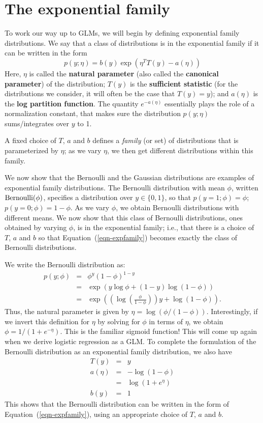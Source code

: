 \documentclass{article}
\begin{document}
\section{The exponential family}

To work our way up to GLMs, we will begin by defining exponential family distributions.
We say that a class of distributions is in the exponential family if it can be written
in the form
\begin{equation}
p(y;\eta) = b(y) \exp(\eta^T T(y) - a(\eta))        \label{eqn-expfamily}
\end{equation}
Here, $\eta$ is called the {\bf natural parameter}
(also called the {\bf canonical parameter}) of the distribution;
$T(y)$ is the {\bf sufficient statistic} (for the distributions we consider,
it will often be the case that $T(y)=y$); and $a(\eta)$ is the {\bf log partition
function}.  The quantity $e^{-a(\eta)}$ essentially plays the role of a normalization
constant, that makes sure the distribution $p(y;\eta)$ sums/integrates over $y$ to 1.

A fixed choice of $T$, $a$ and $b$ defines a \emph{family} (or set) of distributions
that is parameterized by $\eta$; as we vary $\eta$, we then get different distributions
within this family.

We now show that the Bernoulli and the Gaussian distributions are examples of exponential family distributions.
The Bernoulli distribution with mean $\phi$,
written ${\rm Bernoulli}(\phi)$, specifies a distribution over $y \in \{0,1\}$, so that
$p(y=1;\phi)=\phi$; $p(y=0;\phi)=1-\phi$.  As we vary $\phi$, we obtain Bernoulli
distributions with different means.  We now show that this class of Bernoulli
distributions, ones obtained by varying $\phi$, is in the exponential family; i.e.,
that there is a choice of $T$, $a$ and $b$ so that Equation~(\ref{eqn-expfamily})
becomes exactly the class of Bernoulli distributions.

We write the Bernoulli distribution as:
\begin{eqnarray*}
p(y;\phi) &=& \phi^y (1-\phi)^{1-y} \\
&=& \exp(y\log\phi + (1-y) \log(1-\phi)) \\
&=& \exp\left( \left(\log\left(\frac{\phi}{1-\phi}\right)\right)y + \log(1-\phi)\right).
\end{eqnarray*}
Thus, the natural parameter is given by $\eta = \log(\phi/(1-\phi))$.
Interestingly, if we invert this definition for $\eta$ by solving
for $\phi$ in terms of $\eta$, we obtain $\phi = 1/(1+e^{-\eta})$.  This is
the familiar sigmoid function!  This will come up again when we derive logistic
regression as a GLM.  To complete the formulation of the Bernoulli
distribution as an exponential family
distribution, we also have
\begin{eqnarray*}
T(y) &=& y \\
a(\eta) &=& -\log(1-\phi) \\
  &=& \log(1+e^\eta) \\
b(y)&=&1
\end{eqnarray*}
This shows that the Bernoulli distribution can be written in the form
of Equation~(\ref{eqn-expfamily}), using an appropriate choice of $T$, $a$ and $b$.
\end{document}
